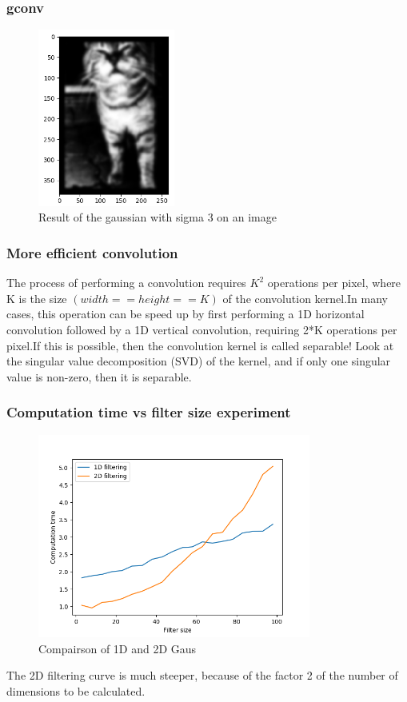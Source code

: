 \documentclass[12pt]{article}
\begin{document}
\subsubsection{gconv}
\begin{figure}[!htb]
  \centering
  \includegraphics[width=0.4\textwidth]{pics/gaussFiltered}
  \caption{Result of the gaussian with sigma 3 on an image}
\end{figure}

\subsubsection{More efficient convolution}
The process of performing a convolution requires $K^2$ operations per pixel, where K is the size $(width == height == K)$ of the 
convolution kernel.In many cases, this operation can be speed up by first performing a 1D horizontal convolution followed by a 1D 
vertical convolution, requiring 2*K operations per pixel.If this is possible, then the convolution kernel is called separable!
Look at the singular value decomposition (SVD) of the kernel, and if only one singular value is non-zero, then it is separable.

\subsubsection{Computation time vs filter size experiment}
\begin{figure}[!htb]
    \centering
    \includegraphics[width=0.8\textwidth]{pics/compTime}
    \caption{Compairson of 1D and 2D Gaus}
  \end{figure}
  The 2D filtering curve is much steeper, because of the factor 2 of
  the number of dimensions to be calculated.
  \newpage
\end{document}
